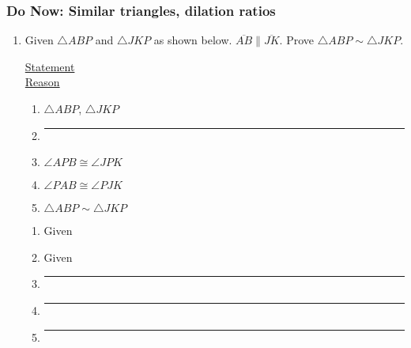 \documentclass[12pt, twoside]{article}
\begin{document}
\subsubsection*{Do Now: Similar triangles, dilation ratios}
 \begin{enumerate}

   \item Given $\triangle ABP$ and $\triangle JKP$ as shown below. $\overline{AB} \parallel \overline{JK}$. Prove $\triangle ABP \sim \triangle JKP$.\\[0.5cm]

     \begin{multicols}{2}
       \underline{Statement} \\
       \underline{Reason}
     \end{multicols}
     \begin{multicols}{2}
       \raggedcolumns
       \begin{enumerate}[label={\arabic*)}]
         \item $\triangle ABP$, $\triangle JKP$ \vspace{0.3cm}
         \item \rule{4cm}{0.15mm} \vspace{0.3cm}
         \item $\angle APB \cong \angle JPK$  \vspace{0.3cm}
         \item $\angle PAB \cong \angle PJK$ \vspace{0.3cm}
         \item $\triangle ABP \sim \triangle JKP$ \vspace{0.3cm}
       \end{enumerate}
       \begin{enumerate}[label={\arabic*)}]
         \item Given \vspace{0.3cm}
         \item Given \vspace{0.3cm}
         \item \rule{4cm}{0.15mm} \vspace{0.3cm}
         \item \rule{4cm}{0.15mm} \vspace{0.3cm}
         \item \rule{4cm}{0.15mm} \vspace{0.3cm}
       \end{enumerate}
     \end{multicols}


\end{enumerate}
\end{document}
